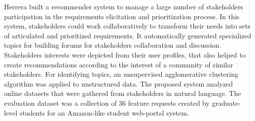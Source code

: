 	Herrera \etal \cite{Castro-Herrera:2009} built a recommender system to manage a large number of stakeholders participation in
the requirements elicitation and prioritization process. In this system, stakeholders could work collaboratively to transform their needs into sets
of articulated and prioritized requirements. It automatically
generated specialized topics for building forums for stakeholders collaboration and discussion. Stakeholders interests were depicted from their user profiles, that also helped to create recommendations according to the
interest of a community of similar stakeholders. For identifying topics, an unsupervised agglomerative clustering algorithm was
applied to unstructured data. The proposed system analyzed online
datasets that were gathered from stakeholders in natural language. 
The evaluation dataset was a collection of 36 feature requests created by
graduate-level students for an Amazon-like student web-portal system.







